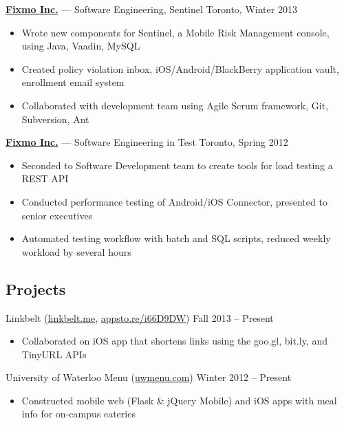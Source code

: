 \documentclass[letterpaper]{article}
\begin{document}
\noindent
\href{http://fixmo.com}{\textbf{Fixmo Inc.}} --- Software Engineering, Sentinel \hfill {\color{gray} Toronto, Winter 2013}

\begin{itemize}[leftmargin=1pc]
\itemsep0em
\item Wrote new components for Sentinel, a Mobile Risk Management console, using Java, Vaadin, MySQL
\item Created policy violation inbox, iOS/Android/BlackBerry application vault, enrollment email system
\item Collaborated with development team using Agile Scrum framework, Git, Subversion, Ant
\end{itemize}

\noindent
\href{http://fixmo.com}{\textbf{Fixmo Inc.}} --- Software Engineering in Test \hfill {\color{gray} Toronto, Spring 2012}

\begin{itemize}[leftmargin=1pc]
\itemsep0em
\item Seconded to Software Development team to create tools for load testing a REST API
\item Conducted performance testing of Android/iOS Connector, presented to senior executives
\item Automated testing workflow with batch and SQL scripts, reduced weekly workload by several hours
\end{itemize}

\subsection*{Projects}

\noindent
Linkbelt (\href{http://linkbelt.me}{linkbelt.me}, \href{http://appsto.re/i66D9DW}{appsto.re/i66D9DW}) \hfill {\color{gray} Fall 2013 -- Present}

\begin{itemize}[leftmargin=1pc]
\itemsep0em
\item Collaborated on iOS app that shortens links using the goo.gl, bit.ly, and TinyURL APIs
\end{itemize}

\noindent
University of Waterloo Menu (\href{http://uwmenu.com}{uwmenu.com}) \hfill {\color{gray} Winter 2012 -- Present}

\begin{itemize}[leftmargin=1pc]
\itemsep0em
\item Constructed mobile web (Flask \& jQuery Mobile) and iOS apps with meal info for on-campus eateries
\end{itemize}
\end{document}
